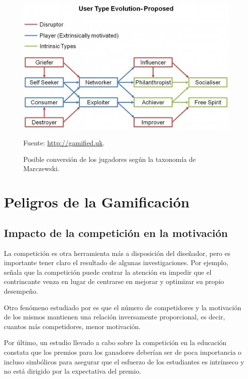 \begin{figure}[hbtp]
\begin{center}
\caption{Posible conversión de los jugadores según la taxonomía de Marczewski.}
\label{fig::MarczewskiEvol}
\includegraphics[scale=0.65]{img/evolution.jpg}

\vspace{-0.25cm}
\small{Fuente: \url{http://gamified.uk}.}
\end{center}
\end{figure}
\FloatBarrier





\section{Peligros de la Gamificación}

\subsection{Impacto de la competición en la motivación}


La competición es otra herramienta más a disposición del diseñador, pero es importante tener claro el resultado de algunas investigaciones.
%
Por ejemplo,  \cite{Crawford_CompetitionDef} señala que la competición puede centrar la atención en impedir que el contrincante venza en lugar de centrarse en mejorar y optimizar su propio desempeño.

Otro fenómeno estudiado por  \cite{n-effect} es que el número de competidores y la motivación de los mismos mantienen una relación inversamente proporcional, es decir, cuantos más competidores, menor motivación.

Por último, un estudio llevado a cabo sobre la competición en la educación  \cite{CompetitionInEd} constata que los premios para los ganadores deberían ser de poca importancia o incluso simbólicos para asegurar que el esfuerzo de los estudiantes es intrínseco y no está dirigido por la expectativa del premio.



